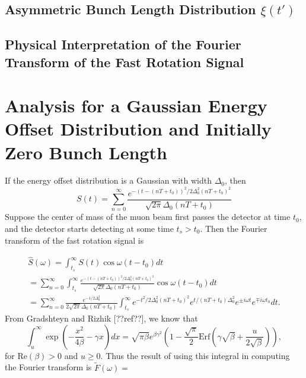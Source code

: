 \subsection{Asymmetric Bunch Length Distribution $\xi(t')$}

\subsection{Physical Interpretation of the Fourier Transform of the Fast Rotation Signal}

\section{Analysis for a Gaussian Energy Offset Distribution and Initially Zero Bunch Length}

If the energy offset distribution is a Gaussian with width $\Delta_0$, then \[S(t)=\sum^{\infty}_{n=0}\frac{e^{-(t-(nT+t_0))^2/2\Delta^2_0(nT+t_0)^2}}{\sqrt{2\pi}\Delta_0(nT+t_0)}\] Suppose the center of mass of the muon beam first passes the detector at time $t_0$, and the detector starts detecting at some time $t_s>t_0$. Then the Fourier transform of the fast rotation signal is

\begin{gather}
\hat{S}(\omega)=\int^{\infty}_{t_s}S(t)\cos\omega(t-t_0) dt \nonumber \\
=\sum^{\infty}_{n=0}\int^{\infty}_{t_s}\frac{e^{-(t-(nT+t_0))^2/2\Delta^2_0(nT+t_0)^2}}{\sqrt{2\pi}\Delta_0(nT+t_0)}\cos\omega(t-t_0)dt \nonumber \\ 
=\sum^{\infty}_{n=0}\frac{e^{-1/2\Delta^2_0}}{2\sqrt{2\pi}\Delta_0(nT+t_0)}\int^{\infty}_{t_s}e^{-t^2/2\Delta^2_0(nT+t_0)^2}e^{t/(nT+t_0)\Delta^2_0}e^{\pm i\omega t}e^{\mp i\omega t_0}dt.
\end{gather}
From Gradshteyn and Rizhik [??ref??], we know that 
\begin{equation}
\int^{\infty}_u\exp\left(-\frac{x^2}{4\beta}-\gamma x\right)dx=\sqrt{\pi\beta}e^{\beta\gamma^2}\left(1-\frac{\sqrt{\pi}}{2}\text{Erf}\left(\gamma\sqrt{\beta}+\frac{u}{2\sqrt{\beta}}\right)\right),
\end{equation}
for $\text{Re}(\beta)>0$ and $u\geq0$. Thus the result of using this integral in computing the Fourier transform is $\tilde{F}(\omega)=$ 

